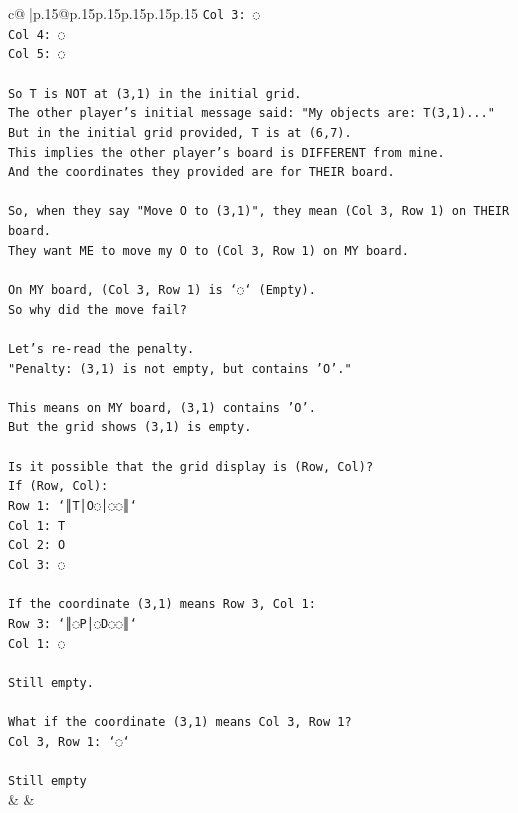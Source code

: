 \documentclass{article}
\begin{document}
{\begin{supertabular}{c@{$\;$}|p{.15\linewidth}@{}p{.15\linewidth}p{.15\linewidth}p{.15\linewidth}p{.15\linewidth}p{.15\linewidth}}
{{{\texttt{Col 3: ◌} \\
\texttt{Col 4: ◌} \\
\texttt{Col 5: ◌} \\
\\ 
\texttt{So T is NOT at (3,1) in the initial grid.} \\
\texttt{The other player's initial message said: "My objects are: T(3,1)..."} \\
\texttt{But in the initial grid provided, T is at (6,7).} \\
\texttt{This implies the other player's board is DIFFERENT from mine.} \\
\texttt{And the coordinates they provided are for THEIR board.} \\
\\ 
\texttt{So, when they say "Move O to (3,1)", they mean (Col 3, Row 1) on THEIR board.} \\
\texttt{They want ME to move my O to (Col 3, Row 1) on MY board.} \\
\\ 
\texttt{On MY board, (Col 3, Row 1) is `◌` (Empty).} \\
\texttt{So why did the move fail?} \\
\\ 
\texttt{Let's re{-}read the penalty.} \\
\texttt{"Penalty: (3,1) is not empty, but contains 'O'."} \\
\\ 
\texttt{This means on MY board, (3,1) contains 'O'.} \\
\texttt{But the grid shows (3,1) is empty.} \\
\\ 
\texttt{Is it possible that the grid display is (Row, Col)?} \\
\texttt{If (Row, Col):} \\
\texttt{Row 1: `║T│O◌│◌◌║`} \\
\texttt{Col 1: T} \\
\texttt{Col 2: O} \\
\texttt{Col 3: ◌} \\
\\ 
\texttt{If the coordinate (3,1) means Row 3, Col 1:} \\
\texttt{Row 3: `║◌P│◌D◌◌║`} \\
\texttt{Col 1: ◌} \\
\\ 
\texttt{Still empty.} \\
\\ 
\texttt{What if the coordinate (3,1) means Col 3, Row 1?} \\
\texttt{Col 3, Row 1: `◌`} \\
\\ 
\texttt{Still empty} \\
            }
        }
    }
    & & \\ \\


\end{supertabular}}
\end{document}
